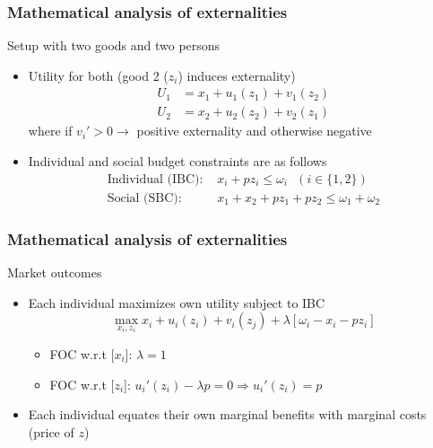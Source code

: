 \documentclass[aspectratio=169]{beamer}
\begin{document}
\begin{frame}
\frametitle{Mathematical analysis of externalities} 
Setup with two goods and two persons
\begin{itemize}\setlength\itemsep{3pt}
  \item Utility for both (good 2 ($z_i$) induces externality)
  \[
  \begin{aligned}
    U_1&= x_1 + u_1(z_1)+v_1(z_2)\\
    U_2&= x_2 + u_2(z_2)+v_2(z_1)
  \end{aligned}
  \]
  where if $v_i'>0\to$ positive externality and otherwise negative
  \item Individual and social budget constraints are as follows
  \[
  \begin{aligned}
    \text{Individual (IBC): }&x_i+pz_i \leq \omega_i \ \ \ (i\in\{1,2\}) \\
    \text{Social (SBC): }&x_1+x_2+pz_1+pz_2 \leq \omega_1+\omega_2
  \end{aligned}
  \]
\end{itemize}
\end{frame}

\begin{frame}
\frametitle{Mathematical analysis of externalities} 
Market outcomes
\begin{itemize}\setlength\itemsep{3pt}
  \item Each individual maximizes own utility subject to IBC
  \[
  \max_{x_i, z_i} x_i + u_i(z_i)+v_i(z_j) + \lambda[\omega_i - x_i-pz_i]
  \]\vspace{-10pt}
  \begin{itemize}\setlength\itemsep{3pt}
    \item FOC w.r.t [$x_i$]: $\lambda=1$
    \item FOC w.r.t [$z_i$]: $u_i'(z_i)-\lambda p=0 \Rightarrow u_i'(z_i)=p $
  \end{itemize}
  \item Each individual equates their own marginal benefits with marginal costs (price of $z$)
\end{itemize}
\end{frame}
\end{document}
